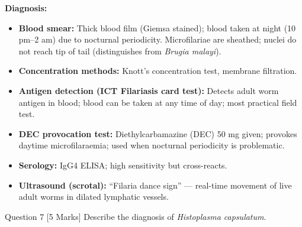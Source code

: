 \documentclass[11pt,a4paper]{article}
\begin{document}
\begin{ansbox}
\textbf{Diagnosis:}
\begin{itemize}[leftmargin=*]
    \item \textbf{Blood smear:} Thick blood film (Giemsa stained); blood taken at night (10 pm--2 am) due to nocturnal periodicity. Microfilariae are sheathed; nuclei do not reach tip of tail (distinguishes from \textit{Brugia malayi}).
    \item \textbf{Concentration methods:} Knott's concentration test, membrane filtration.
    \item \textbf{Antigen detection (ICT Filariasis card test):} Detects adult worm antigen in blood; blood can be taken at any time of day; most practical field test.
    \item \textbf{DEC provocation test:} Diethylcarbamazine (DEC) 50 mg given; provokes daytime microfilaraemia; used when nocturnal periodicity is problematic.
    \item \textbf{Serology:} IgG4 ELISA; high sensitivity but cross-reacts.
    \item \textbf{Ultrasound (scrotal):} ``Filaria dance sign'' --- real-time movement of live adult worms in dilated lymphatic vessels.
\end{itemize}
\end{ansbox}

\begin{qbox}{Question 7 [5 Marks]}
Describe the diagnosis of \textit{Histoplasma capsulatum}.
\end{qbox}
\end{document}
